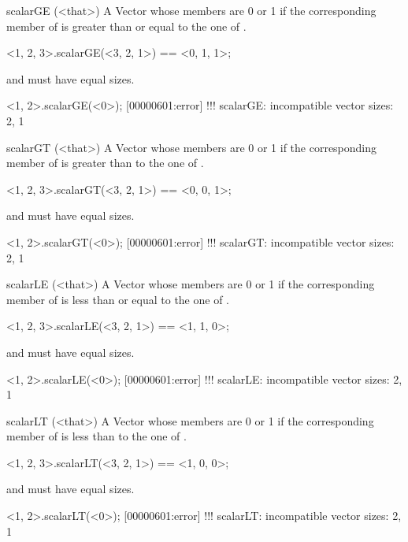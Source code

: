 \begin{urbiscriptapi}
\item[scalarGE](<that>)%
  A Vector whose members are 0 or 1 if the corresponding member of \this is
  greater than or equal to the one of \that.
\begin{urbiassert}
  <1, 2, 3>.scalarGE(<3, 2, 1>) == <0, 1, 1>;
\end{urbiassert}

  \this and \that must have equal sizes.
\begin{urbiscript}
<1, 2>.scalarGE(<0>);
[00000601:error] !!! scalarGE: incompatible vector sizes: 2, 1
\end{urbiscript}


\item[scalarGT](<that>)%
  A Vector whose members are 0 or 1 if the corresponding member of \this is
  greater than to the one of \that.
\begin{urbiassert}
  <1, 2, 3>.scalarGT(<3, 2, 1>) == <0, 0, 1>;
\end{urbiassert}

  \this and \that must have equal sizes.
\begin{urbiscript}
<1, 2>.scalarGT(<0>);
[00000601:error] !!! scalarGT: incompatible vector sizes: 2, 1
\end{urbiscript}


\item[scalarLE](<that>)%
  A Vector whose members are 0 or 1 if the corresponding member of \this is
  less than or equal to the one of \that.
\begin{urbiassert}
  <1, 2, 3>.scalarLE(<3, 2, 1>) == <1, 1, 0>;
\end{urbiassert}

  \this and \that must have equal sizes.
\begin{urbiscript}
<1, 2>.scalarLE(<0>);
[00000601:error] !!! scalarLE: incompatible vector sizes: 2, 1
\end{urbiscript}


\item[scalarLT](<that>)%
  A Vector whose members are 0 or 1 if the corresponding member of \this is
  less than to the one of \that.
\begin{urbiassert}
  <1, 2, 3>.scalarLT(<3, 2, 1>) == <1, 0, 0>;
\end{urbiassert}

  \this and \that must have equal sizes.
\begin{urbiscript}
<1, 2>.scalarLT(<0>);
[00000601:error] !!! scalarLT: incompatible vector sizes: 2, 1
\end{urbiscript}



\end{urbiscriptapi}

